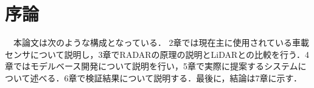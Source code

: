 \chapter{序論}
　本論文は次のような構成となっている． 2章では現在主に使用されている車載センサについて説明し，3章でRADARの原理の説明とLiDARとの比較を行う．4章ではモデルベース開発について説明を行い，5章で実際に提案するシステムについて述べる．6章で検証結果について説明する．最後に，結論は7章に示す．\\



